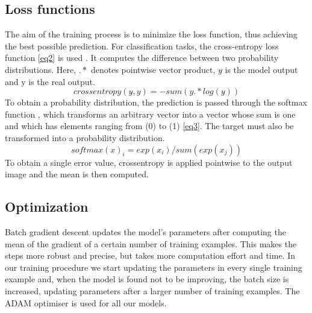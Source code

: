 \documentclass[journal,article,submit,pdftex,moreauthors]{Definitions/mdpi}
\begin{document}
\subsection{Loss functions}
The aim of the training process is to minimize the loss function, thus achieving the best possible prediction.
For classification tasks, the cross-entropy loss function \ref{eq2} is used \cite{Janocha2017OnClassification}. It computes the difference between two probability distributions. Here, \(.*\) denotes pointwise vector product, \(y\hat{}\) is the model output and y is the real output.
\begin{equation} \label{eq2}
crossentropy(y\hat{},y)= -sum(y .*  log(y\hat{}))
\end{equation}
To obtain a probability distribution, the prediction is passed through the softmax function \cite{BridleTrainingParameters}, which transforms an arbitrary vector into a vector whose sum is one and which has elements ranging from (0) to (1) \ref{eq3}. The target must also be transformed into a probability distribution.
\begin{equation} \label{eq3}
softmax(x)_i=exp(x_i)/sum(exp(x_j))
\end{equation}
To obtain a single error value, crossentropy is applied pointwise to the output image and the mean is then computed.

\subsection{Optimization}
Batch gradient descent \cite{Ruder2016AnAlgorithms} updates the model’s parameters after computing the mean of the gradient of a certain number of training examples. This makes the steps more robust and precise, but takes more computation effort and time. In our training procedure we start updating the parameters in every single training example and, when the model is found not to be improving, the batch size is increased, updating parameters after a larger number of training examples.
The ADAM optimiser \cite{Kingma2014Adam:Optimization} is used for all our models.
\end{document}
